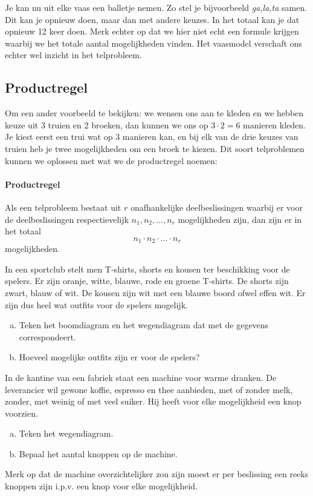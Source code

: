 \documentclass[12pt,a4,twoside]{article}
\begin{document}
Je kan nu uit elke vaas een balletje nemen. Zo stel je bijvoorbeeld {\em ga,la,ta} samen. Dit kan je opnieuw doen, maar dan met andere keuzes. In het totaal kan je dat opnieuw 12 keer doen. Merk echter op dat we hier niet echt een formule krijgen waarbij we het totale aantal mogelijkheden vinden. Het vaasmodel verschaft ons echter wel inzicht in het telprobleem.

\subsection{Productregel}

Om een ander voorbeeld te bekijken: we wensen ons aan te kleden en we hebben keuze uit 3 truien en 2 broeken, dan kunnen we ons op $3 \cdot 2 = 6$ manieren kleden. Je kiest eerst een trui wat op 3 manieren kan, en bij elk van de drie keuzes van truien heb je twee mogelijkheden om een broek te kiezen. Dit soort telproblemen kunnen we oplossen met wat we de productregel noemen:

\paragraph*{Productregel}
\begin{mdframed}
Als een telprobleem bestaat uit $r$ onafhankelijke deelbeslissingen waarbij er voor de deelbeslissingen respectievelijk $n_1, n_2, \ldots , n_r$ mogelijkheden zijn, dan zijn er in het totaal
\[n_1 \cdot n_2 \cdot \ldots \cdot n_r\]
mogelijkheden.
\end{mdframed}

\begin{oefening}
In een sportclub stelt men T-shirts, shorts en kousen ter beschikking voor de spelers. Er zijn oranje, witte, blauwe, rode en groene T-shirts. De shorts zijn zwart, blauw of wit. De kousen zijn wit met een blauwe boord ofwel effen wit. Er zijn dus heel wat outfits voor de spelers mogelijk.

\begin{enumerate}[(a)]
\item Teken het boomdiagram en het wegendiagram dat met de gegevens correspondeert.
\item Hoeveel mogelijke outfits zijn er voor de spelers?
\end{enumerate}
\end{oefening}

\begin{oefening}
In de kantine van een fabriek staat een machine voor warme dranken. De leverancier wil gewone koffie, espresso en thee aanbieden, met of zonder melk, zonder, met weinig of met veel suiker. Hij heeft voor elke mogelijkheid een knop voorzien.
\begin{enumerate}[(a)]
\item Teken het wegendiagram.
\item Bepaal het aantal knoppen op de machine.
\end{enumerate}
Merk op dat de machine overzichtelijker zou zijn moest er per beslissing een reeks knoppen zijn i.p.v. een knop voor elke mogelijkheid.
\end{oefening}
\end{document}
